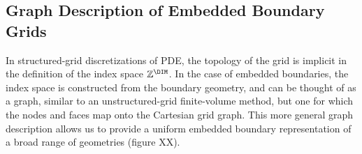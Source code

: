 \documentclass[12pt]{article}
\begin{document}

\subsection{Graph Description of Embedded Boundary Grids}

In structured-grid discretizations of PDE, the topology of the grid is implicit in the definition of the index space $\mbb{Z}^\DIM$. In the case of embedded boundaries, the index space is constructed from the boundary geometry, and can be thought of as a graph, similar to an unstructured-grid finite-volume method, but one for which the nodes and faces map onto the Cartesian grid graph. This more general graph description allows us to provide a uniform embedded boundary representation of a broad range of geometries (figure XX).  
\end{document}
